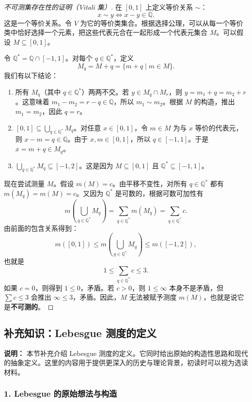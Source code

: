 \begin{proof}[不可测集存在性的证明（Vitali 集）]
在 $[0,1]$ 上定义等价关系 $\sim$：
\[
x\sim y\iff x-y\in\mathbb{Q}.
\]
这是一个等价关系。令 $V$ 为它的等价类集合。根据选择公理，可以从每一个等价类中恰好选择一个元素，把这些代表元合在一起形成一个代表元集合 $M$。可以假设 $M\subseteq[0,1]$。

令 $\mathbb{Q}^*=\mathbb{Q}\cap[-1,1]$。对每个 $q\in\mathbb{Q}^*$，定义
\[
M_q=M+q=\{m+q\mid m\in M\}.
\]
我们有以下结论：
\begin{enumerate}
    \item 所有 $M_q$（其中 $q\in\mathbb{Q}^*$）两两不交。若 $y\in M_q\cap M_r$，则 $y=m_1+q=m_2+r$。这意味着 $m_1-m_2=r-q\in\mathbb{Q}$，所以 $m_1\sim m_2$。根据 $M$ 的构造，推出 $m_1=m_2$，因此 $q=r$。
    \item $[0,1]\subseteq\bigcup_{q\in\mathbb{Q}^*}M_q$。对任意 $x\in[0,1]$，令 $m\in M$ 为与 $x$ 等价的代表元，则 $x-m=q\in\mathbb{Q}$。由于 $x,m\in[0,1]$，所以 $q\in[-1,1]$。于是 $x=m+q\in M_q$。
    \item $\bigcup_{q\in\mathbb{Q}^*}M_q\subseteq[-1,2]$。这是因为 $M\subseteq[0,1]$ 且 $\mathbb{Q}^*\subseteq[-1,1]$。
\end{enumerate}

现在尝试测量 $M$。假设 $m(M)=c$。由平移不变性，对所有 $q\in\mathbb{Q}^*$ 都有 $m(M_q)=m(M)=c$。又因为 $\mathbb{Q}^*$ 是可数的，根据可数可加性有
\[
m\left(\bigcup_{q\in\mathbb{Q}^*}M_q\right)=\sum_{q\in\mathbb{Q}^*}m(M_q)=\sum_{q\in\mathbb{Q}^*}c.
\]
由前面的包含关系得到：
\[
m([0,1])\le m\left(\bigcup_{q\in\mathbb{Q}^*}M_q\right)\le m([-1,2]),
\]
也就是
\[
1\le \sum_{q\in\mathbb{Q}^*}c\le 3.
\]
如果 $c=0$，则得到 $1\le0$，矛盾。若 $c>0$，则 $1\le\infty$ 本身不是矛盾，但 $\sum c\le3$ 会推出 $\infty\le3$，矛盾。因此，$M$ 无法被赋予测度 $m(M)$，也就是说它是\textbf{不可测的}。
\end{proof}

\subsection*{补充知识：Lebesgue 测度的定义}

\begin{remark}
\textbf{说明：} 本节补充介绍 Lebesgue 测度的定义。它同时给出原始的构造性思路和现代的抽象定义。这里的内容用于提供更深入的历史与理论背景，初读时可以视为选读材料。
\end{remark}

\subsubsection*{1. Lebesgue 的原始想法与构造}

